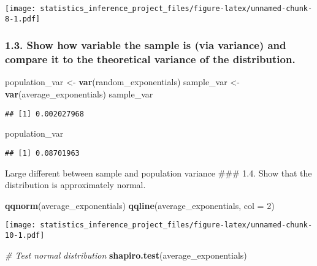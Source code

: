 \documentclass[]{article}
\newenvironment{Shaded}{\begin{snugshade}}{\end{snugshade}}
\newcommand{\KeywordTok}[1]{\textcolor[rgb]{0.13,0.29,0.53}{\textbf{#1}}}
\newcommand{\DataTypeTok}[1]{\textcolor[rgb]{0.13,0.29,0.53}{#1}}
\newcommand{\DecValTok}[1]{\textcolor[rgb]{0.00,0.00,0.81}{#1}}
\newcommand{\StringTok}[1]{\textcolor[rgb]{0.31,0.60,0.02}{#1}}
\newcommand{\CommentTok}[1]{\textcolor[rgb]{0.56,0.35,0.01}{\textit{#1}}}
\newcommand{\NormalTok}[1]{#1}
\begin{document}
\texttt{[image: statistics\_inference\_project\_files/figure-latex/unnamed-chunk-8-1.pdf]}

\subsubsection{1.3. Show how variable the sample is (via variance) and
compare it to the theoretical variance of the
distribution.}\label{show-how-variable-the-sample-is-via-variance-and-compare-it-to-the-theoretical-variance-of-the-distribution.}

\begin{Shaded}
\begin{Highlighting}[]
\NormalTok{population_var <-}\StringTok{ }\KeywordTok{var}\NormalTok{(random_exponentials)}
\NormalTok{sample_var <-}\StringTok{ }\KeywordTok{var}\NormalTok{(average_exponentials)}
\NormalTok{sample_var}
\end{Highlighting}
\end{Shaded}

\begin{verbatim}
## [1] 0.002027968
\end{verbatim}

\begin{Shaded}
\begin{Highlighting}[]
\NormalTok{population_var}
\end{Highlighting}
\end{Shaded}

\begin{verbatim}
## [1] 0.08701963
\end{verbatim}

Large different between sample and population variance \#\#\# 1.4. Show
that the distribution is approximately normal.

\begin{Shaded}
\begin{Highlighting}[]
\KeywordTok{qqnorm}\NormalTok{(average_exponentials)}
\KeywordTok{qqline}\NormalTok{(average_exponentials, }\DataTypeTok{col =} \DecValTok{2}\NormalTok{)}
\end{Highlighting}
\end{Shaded}

\texttt{[image: statistics\_inference\_project\_files/figure-latex/unnamed-chunk-10-1.pdf]}

\begin{Shaded}
\begin{Highlighting}[]
\CommentTok{# Test normal distribution}
\KeywordTok{shapiro.test}\NormalTok{(average_exponentials)}
\end{Highlighting}
\end{Shaded}
\end{document}
